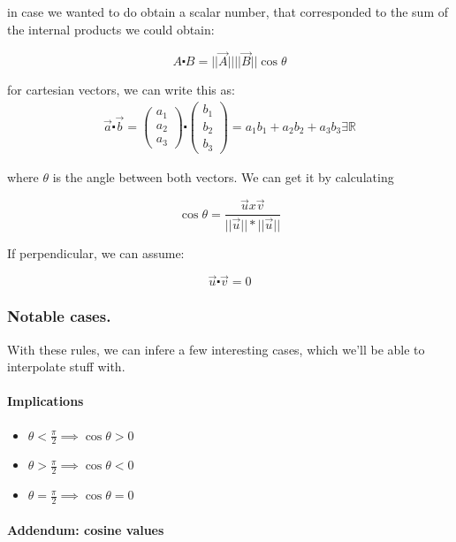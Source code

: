\documentclass[11pt,fleqn]{book} %
\begin{document}
in case we wanted to do obtain a scalar number, that corresponded to the sum of the internal products
we could obtain:

\begin{equation}
    A \centerdot B = ||\vec{A}|| ||\vec{B}||  \cos \theta
\end{equation}

for cartesian vectors, we can write this as:
\begin{gather}
    \vec{a} \centerdot \vec{b} = 
    \begin{pmatrix}
        a_1 \\
        a_2 \\
        a_3
    \end{pmatrix}
    \centerdot
    \begin{pmatrix}
        b_1 \\
        b_2 \\
        b_3
    \end{pmatrix}
    = a_1 b_1 + a_2 b_2 + a_3 b_3 \exists \mathbb{R}
\end{gather}


where $ \theta $ is the angle between both vectors. We can get it by calculating

$$ \cos \theta = \frac{\vec{u} x \vec{v}}{||\vec{u}||*||\vec{u}||} $$

If perpendicular, we can assume:

$$ \vec{u} \centerdot \vec{v} = 0 $$

\subsubsection{Notable cases.}

With these rules, we can infere a few interesting cases, which we'll be able to interpolate stuff with.

\paragraph*{Implications}

\begin{itemize}
    \item $ \theta < \frac{\pi}{2} \implies \cos \theta > 0 $
    \item $ \theta > \frac{\pi}{2} \implies \cos \theta < 0 $
    \item $ \theta = \frac{\pi}{2} \implies \cos \theta = 0$
\end{itemize}

\paragraph{Addendum: cosine values}
\end{document}
